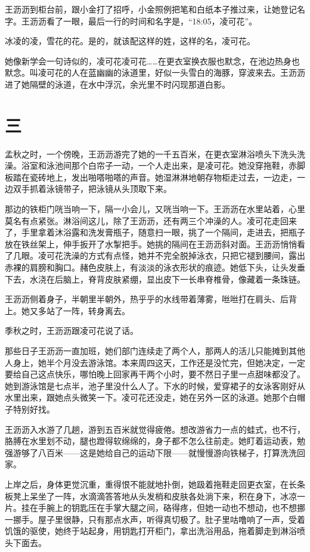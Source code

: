 \documentclass[lang=cn,newtx,12pt,scheme=chinese]{elegantbook}
\begin{document}
王沥沥到柜台前，跟小金打了招呼，小金照例把笔和白纸本子推过来，让她登记名字。王沥沥看了一眼，最后一行的时间和名字是，“18:05，凌可花”。

冰凌的凌，雪花的花。是的，就该配这样的姓，这样的名，凌可花。

她像新学会一句诗似的，凌可花凌可花……在更衣室换衣服也默念，在池边热身也默念。叫凌可花的人在蓝幽幽的泳道里，好似一头雪白的海豚，穿波来去。王沥沥进了她隔壁的泳道，在水中浮沉，余光里不时闪现那道白影。
\section{三}
孟秋之时，一个傍晚，王沥沥游完了她的一千五百米，在更衣室淋浴喷头下洗头洗澡。浴室和泳池间那个白帘子一动，一个人走出来，是凌可花。她没穿拖鞋，赤脚板踏在瓷砖地上，发出啪嗒啪嗒的声音。她湿淋淋地朝存物柜走过去，一边走，一边双手抓着泳镜带子，把泳镜从头顶取下来。

那边的铁柜门咣当响一下，隔一小会儿，又咣当响一下。王沥沥在水里站着，心里莫名有点紧张。淋浴间这儿，除了王沥沥，还有两三个冲澡的人。凌可花走回来了，手里拿着沐浴露和洗发膏瓶子，随意扫一眼，挑了一个隔间，走进去，把瓶子放在铁丝架上，伸手扳开了水掣把手。她挑的隔间在王沥沥斜对面。王沥沥悄悄看了几眼。凌可花洗澡的方式有点怪，她并不完全脱掉泳衣，只把它褪到腰间，露出赤裸的肩膀和胸口。赭色皮肤上，有淡淡的泳衣形状的痕迹。她低下头，让头发垂下去，水浇在后脑上，脊背皮肤紧绷，显出皮下一长串脊椎骨，像藏着一条珠链。

王沥沥侧着身子，半朝里半朝外，热乎乎的水线带着薄雾，咝咝打在肩头、后背上。她又多站了一阵，转身离去。

季秋之时，王沥沥跟凌可花说了话。

那些日子王沥沥一直加班，她们部门连续走了两个人，那两人的活儿只能摊到其他人身上，她半个月没去游泳馆。本来周四这天，工作还是没忙完，但她决定，一定要给自己这点快乐，哪怕晚上回家再干两个小时，要不然日子里一点甜味都没了。她到游泳馆是七点半，池子里没什么人了。下水的时候，爱穿裙子的女泳客刚好从水里出来，跟她点头微笑一下。凌可花还没走，她在另外一区的泳道。她那个白帽子特别好找。

王沥沥入水游了几趟，游到五百米就觉得疲倦。想改游省力一点的蛙式，也不行，胳膊在水里划不动，腿也蹬得软绵绵的，身子都不怎么往前走。她盯着运动表，勉强游够了八百米——这是她给自己的运动下限——就慢慢游向铁梯子，打算洗洗回家。

上岸之后，身体更觉沉重，重得恨不能就地扑倒，她趿着拖鞋走回更衣室，在长条板凳上呆坐了一阵，水滴滴答答地从头发梢和皮肤各处淌下来，积在身下，冰凉一片。挂在手腕上的钥匙压在手掌大腿之间，硌得疼，但她一动也不想动，也不想挪一挪手。屋子里很静，只有那点水声，听得真切极了。肚子里咕噜响了一声，受着饥饿的驱使，她终于站起身，用钥匙打开柜门，拿出洗浴用品，拖着脚走到淋浴喷头下面去。
\end{document}
